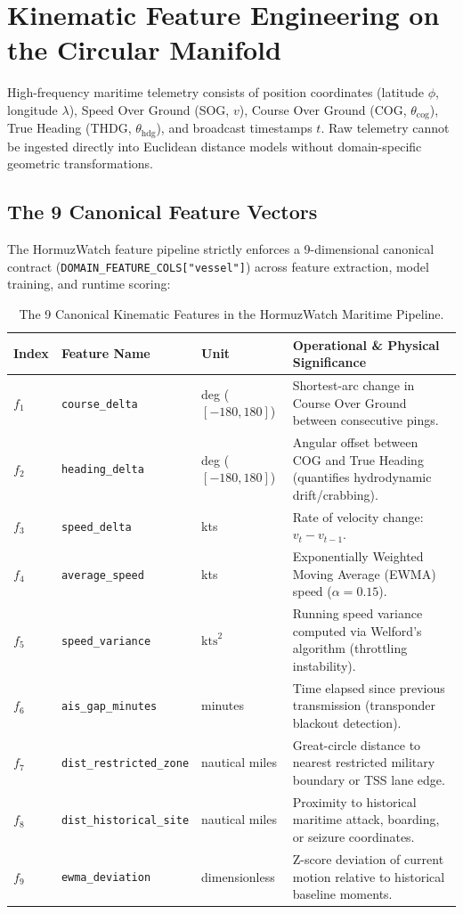 \section{Kinematic Feature Engineering on the Circular Manifold}
\label{sec:feature_engineering}

High-frequency maritime telemetry consists of position coordinates (latitude $\phi$, longitude $\lambda$), Speed Over Ground (SOG, $v$), Course Over Ground (COG, $\theta_{\text{cog}}$), True Heading (THDG, $\theta_{\text{hdg}}$), and broadcast timestamps $t$. Raw telemetry cannot be ingested directly into Euclidean distance models without domain-specific geometric transformations.

\subsection{The 9 Canonical Feature Vectors}
The HormuzWatch feature pipeline strictly enforces a 9-dimensional canonical contract (\texttt{DOMAIN\_FEATURE\_COLS["vessel"]}) across feature extraction, model training, and runtime scoring:

\begin{table}[htbp]
\centering
\small
\begin{tabular}{lllp{6.8cm}}
\toprule
\textbf{Index} & \textbf{Feature Name} & \textbf{Unit} & \textbf{Operational \& Physical Significance} \\
\midrule
$f_1$ & \texttt{course\_delta} & deg ($[-180, 180]$) & Shortest-arc change in Course Over Ground between consecutive pings. \\
$f_2$ & \texttt{heading\_delta} & deg ($[-180, 180]$) & Angular offset between COG and True Heading (quantifies hydrodynamic drift/crabbing). \\
$f_3$ & \texttt{speed\_delta} & kts & Rate of velocity change: $v_t - v_{t-1}$. \\
$f_4$ & \texttt{average\_speed} & kts & Exponentially Weighted Moving Average (EWMA) speed ($\alpha=0.15$). \\
$f_5$ & \texttt{speed\_variance} & $\text{kts}^2$ & Running speed variance computed via Welford's algorithm (throttling instability). \\
$f_6$ & \texttt{ais\_gap\_minutes} & minutes & Time elapsed since previous transmission (transponder blackout detection). \\
$f_7$ & \texttt{dist\_restricted\_zone} & nautical miles & Great-circle distance to nearest restricted military boundary or TSS lane edge. \\
$f_8$ & \texttt{dist\_historical\_site} & nautical miles & Proximity to historical maritime attack, boarding, or seizure coordinates. \\
$f_9$ & \texttt{ewma\_deviation} & dimensionless & Z-score deviation of current motion relative to historical baseline moments. \\
\bottomrule
\end{tabular}
\caption{The 9 Canonical Kinematic Features in the HormuzWatch Maritime Pipeline.}
\label{tab:canonical_features}
\end{table}

